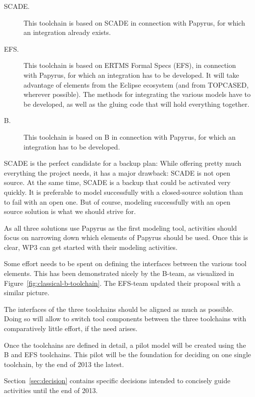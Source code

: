 \begin{description}
\item[SCADE.] This toolchain is based on SCADE in connection with Papyrus, for which an integration already exists.

\item[EFS.] This toolchain is based on ERTMS Formal Specs (EFS), in connection with Papyrus, for which an integration has to be developed.  It will take advantage of elements from the Eclipse ecosystem (and from TOPCASED, wherever possible).  The methods for integrating the various models have to be developed, as well as the gluing code that will hold everything together.

\item[B.] This toolchain is based on B in connection with Papyrus, for which an integration has to be developed.

\end{description}

SCADE is the perfect candidate for a backup plan: While offering pretty much everything the project needs, it has a major drawback: SCADE is not open source.  At the same time, SCADE is a backup that could be activated very quickly.  It is preferable to model successfully with a closed-source solution than to fail with an open one.  But of course, modeling successfully with an open source solution is what we should strive for.

As all three solutions use Papyrus as the first modeling tool, activities should focus on narrowing down which elements of Papyrus should be used.  Once this is clear, WP3 can get started with their modeling activities.

Some effort needs to be spent on defining the interfaces between the various tool elements.  This has been demonstrated nicely by the B-team, as visualized in Figure~\ref{fig:classical-b-toolchain}.  The EFS-team updated their proposal with a similar picture.

The interfaces of the three toolchains should be aligned as much as possible.  Doing so will allow to switch tool components between the three toolchains with comparatively little effort, if the need arises.

Once the toolchains are defined in detail, a pilot model will be created using the B and EFS toolchains.  This pilot will be the foundation for deciding on one single toolchain, by the end of 2013 the latest.

Section~\ref{sec:decision} contains specific decisions intended to concisely guide activities until the end of 2013.

